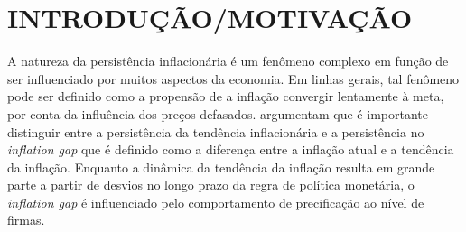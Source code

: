 \documentclass[twoside,a4paper,11pt]{report}
\begin{document}








\tableofcontents

\cleardoublepage

\pagestyle{fancy}


\chapter{INTRODUÇÃO/MOTIVAÇÃO}\label{introen03}


A natureza da persistência inflacionária é um fenômeno complexo em função de ser influenciado por muitos aspectos da economia. Em linhas gerais, tal fenômeno pode ser definido como a propensão de a inflação convergir lentamente à meta, por conta da influência dos preços defasados. \citet{cogley2008trend} argumentam que é importante distinguir entre a persistência da tendência inflacionária e a persistência no \emph{inflation gap} que é definido como a diferença entre a inflação atual e a tendência da inflação. Enquanto a dinâmica da tendência da inflação resulta em grande parte a partir de desvios no longo prazo da regra de política monetária, o \emph{inflation gap} é influenciado pelo comportamento de precificação ao nível de firmas.  
\end{document}

